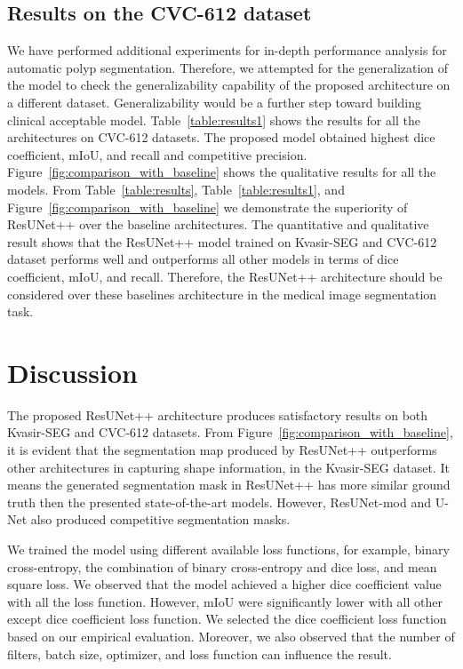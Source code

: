 \documentclass[conference]{IEEEtran}
\newcommand{\resunetplusplus}{ResUNet++\xspace}
\begin{document}
 \subsection{Results on the CVC-612 dataset}
We have performed additional experiments for in-depth performance analysis for automatic polyp segmentation. Therefore, we attempted for the generalization of the model to check the generalizability capability of the proposed architecture on a different dataset. Generalizability would be a further step toward building clinical acceptable model. Table~\ref{table:results1} shows the results for all the architectures on CVC-612 datasets. The proposed model obtained highest dice coefficient, \ac{mIoU}, and recall and competitive precision. \\ 

Figure~\ref{fig:comparison_with_baseline} shows the qualitative results for all the models. From Table~\ref{table:results}, Table~\ref{table:results1}, and Figure~\ref{fig:comparison_with_baseline} we demonstrate the superiority of \resunetplusplus over the baseline architectures. The quantitative and qualitative result shows that the \resunetplusplus model trained on Kvasir-SEG and CVC-612 dataset performs well and outperforms all other models in terms of dice coefficient, \ac{mIoU}, and recall. Therefore, the \resunetplusplus architecture should be considered over these baselines architecture in the medical image segmentation task.



\section{Discussion}
\label{discussion}

The proposed \resunetplusplus architecture produces satisfactory results on both Kvasir-SEG and CVC-612 datasets. From Figure~\ref{fig:comparison_with_baseline}, it is evident that the segmentation map produced by \resunetplusplus outperforms other architectures in capturing shape information, in the Kvasir-SEG dataset. It means the generated segmentation mask in \resunetplusplus has more similar ground truth then the presented state-of-the-art models. However, ResUNet-mod and U-Net also produced competitive segmentation masks.

We trained the model using different available loss functions, for example, binary cross-entropy, the combination of binary cross-entropy and dice loss, and mean square loss. We observed that the model achieved a higher dice coefficient value with all the loss function. However, \ac{mIoU} were significantly lower with all other except dice coefficient loss function. We selected the dice coefficient loss function based on our empirical evaluation. Moreover, we also observed that the number of filters, batch size, optimizer, and loss function can influence the result.  
\end{document}

